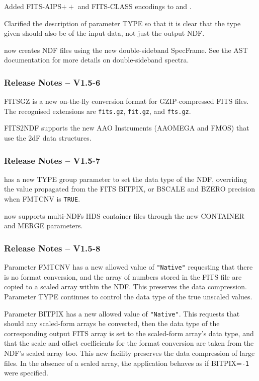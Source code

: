 \documentclass[twoside,11pt]{starlink}
\begin{document}
Added FITS-AIPS$++$ and FITS-CLASS encodings to
 and .

Clarified the description of  parameter TYPE
so that it is clear that the type given should also be of the input
data, not just the output NDF.

 now creates NDF files using the new
double-sideband SpecFrame.  See the AST documentation for more details
on double-sideband spectra.

\subsubsection{Release Notes -- V1.5-6}

FITSGZ is a new on-the-fly conversion format for GZIP-compressed FITS
files.  The recognised extensions are \texttt{fits.gz}, \texttt{fit.gz}, and
\texttt{fts.gz}.

FITS2NDF supports the new AAO Instruments (AAOMEGA and FMOS) that use
the 2dF data structures.

\subsubsection{Release Notes -- V1.5-7}

 has a new TYPE group parameter to set the
data type of the NDF, overriding the value propagated from the FITS
BITPIX, or BSCALE and BZERO precision when FMTCNV is \texttt{TRUE}.

 now supports multi-NDFs HDS container files
through the new CONTAINER and MERGE parameters.

\subsubsection{Release Notes -- V1.5-8}

 Parameter FMTCNV has a new allowed value
of \texttt{"Native"} requesting that there is no format conversion, and
the array of numbers stored in the FITS file are copied to a scaled array
within the NDF.  This preserves the data compression.  Parameter TYPE
continues to control the data type of the true unscaled values.

 Parameter BITPIX has a new allowed value
of \texttt{"Native"}.  This requests that should any scaled-form arrays be
converted, then the data type of the corresponding output FITS array
is set to the scaled-form array's data type, and that the scale and
offset coefficients for the format conversion are taken from the NDF's
scaled array too.  This new facility preserves the data compression
of large files.  In the absence of a scaled array, the application
behaves as if BITPIX=\texttt{-1} were specified.
\end{document}
